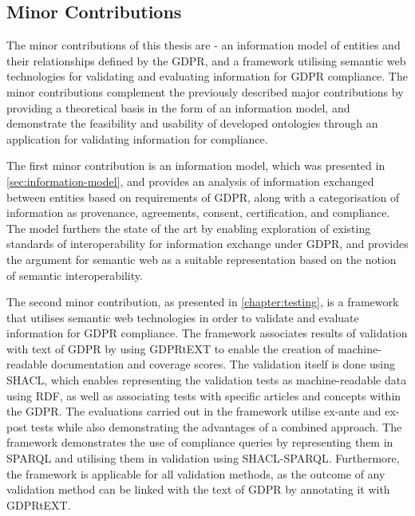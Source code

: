 \subsection*{Minor Contributions}
The minor contributions of this thesis are - an information model of entities and their relationships defined by the GDPR, and a framework utilising semantic web technologies for validating and evaluating information for GDPR compliance. The minor contributions complement the previously described major contributions by providing a theoretical basis in the form of an information model, and demonstrate the feasibility and usability of developed ontologies through an application for validating information for compliance.

The first minor contribution is an information model, which was presented in \autoref{sec:information-model}, and provides an analysis of information exchanged between entities based on requirements of GDPR, along with a categorisation of information as provenance, agreements, consent, certification, and compliance. The model furthers the state of the art by enabling exploration of existing standards of interoperability for information exchange under GDPR, and provides the argument for semantic web as a suitable representation based on the notion of semantic interoperability.

The second minor contribution, as presented in \autoref{chapter:testing}, is a framework that utilises semantic web technologies in order to validate and evaluate information for GDPR compliance. The framework associates results of validation with text of GDPR by using GDPRtEXT to enable the creation of machine-readable documentation and coverage scores. The validation itself is done using SHACL, which enables representing the validation tests as machine-readable data using RDF, as well as associating tests with specific articles and concepts within the GDPR. 
The evaluations carried out in the framework utilise ex-ante and ex-post tests while also demonstrating the advantages of a combined approach.
The framework demonstrates the use of compliance queries by representing them in SPARQL and utilising them in validation using SHACL-SPARQL. 
Furthermore, the framework is applicable for all validation methods, as the outcome of any validation method can be linked with the text of GDPR by annotating it with GDPRtEXT.




